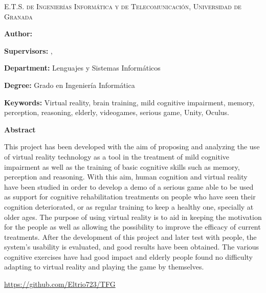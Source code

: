 
\pagestyle{fancy}

\begin{center}
	\scshape
	E.T.S. de Ingenierías Informática y de Telecomunicación, Universidad de Granada
\end{center}

\bigskip

\begin{center}
	\Large \scshape
	\textbf{\tfgtitlenameENG}
\end{center}

\bigskip \bigskip \bigskip

\begin{minipage}{\textwidth}

\textbf{Author:} \tfgauthorname

\medskip

\textbf{Supervisors:} \tfgtutornameA , \tfgtutornameB

\medskip


\medskip

\textbf{Department:} Lenguajes y Sistemas Informáticos

\medskip

\textbf{Degree:} Grado en Ingeniería Informática

\medskip

\textbf{Keywords:} Virtual reality, brain training, mild cognitive impairment, memory, perception, reasoning, elderly, videogames, serious game, Unity, Oculus.

\bigskip \bigskip


\end{minipage}

\begin{center}
	\textbf{Abstract}
\end{center}



This project has been developed with the aim of proposing and analyzing the use of virtual reality technology as a tool in the treatment of mild cognitive impairment as well as the training of basic cognitive skills such as memory, perception and reasoning. With this aim, human cognition and virtual reality have been studied in order to develop a demo of a serious game able to be used as support for cognitive rehabilitation treatments on people who have seen their cognition deteriorated, or as regular training to keep a healthy one, specially at older ages. The purpose of using virtual reality is to aid in keeping the motivation for the people as well as allowing the possibility to improve the efficacy of current treatments. After the development of this project and later test with people, the system's usability is evaluated, and good results have been obtained. The various cognitive exercises have had good impact and elderly people found no difficulty adapting to virtual reality and playing the game by themselves.



\url{https://github.com/Eltrio723/TFG}

\blankpage
